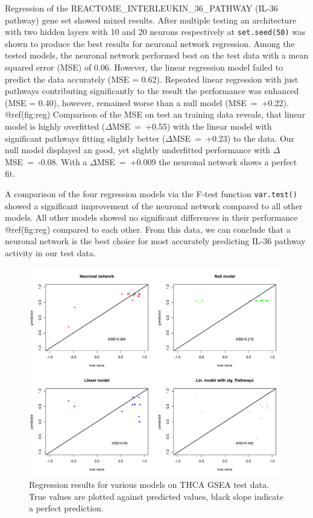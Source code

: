\documentclass[
  parskip,
  oneside]{scrreprt}
\begin{document}
Regression of the REACTOME\_INTERLEUKIN\_36\_PATHWAY (IL-36 pathway)
gene set showed mixed results. After multiple testing an architecture
with two hidden layers with 10 and 20 neurons respectively at
\texttt{set.seed(50)} was shown to produce the best results for neuronal
network regression. Among the tested models, the neuronal network
performed best on the test data with a mean squared error (MSE) of 0.06.
However, the linear regression model failed to predict the data
accurately (MSE = 0.62). Repeated linear regression with just pathways
contributing significantly to the result the performance was enhanced
(MSE = 0.40), however, remained worse than a null model (MSE~=~+0.22).
@ref(fig:reg) Comparison of the MSE on test an training data reveals,
that linear model is highly overfitted (\(\Delta\)MSE~=~+0.55) with the
linear model with significant pathways fitting slightly better
(\(\Delta\)MSE~=~+0.23) to the data. Our null model displayed an good,
yet slightly underfitted performance with \(\Delta\)MSE~=~-0.08. With a
\(\Delta\)MSE~=~+0.009 the neuronal network shows a perfect fit.

A comparison of the four regression models via the F-test function
\texttt{var.test()} showed a significant improvement of the neuronal
network compared to all other models. All other models showed no
significant differences in their performance @ref(fig:reg) compared to
each other. From this data, we can conclude that a neuronal network is
the best choice for most accurately predicting IL-36 pathway activity in
our test data.

\begin{figure}

{\centering \includegraphics[width=0.8\linewidth]{figures/Regression comparison plot IL36 genes} 

}

\caption{Regression results for various models on THCA GSEA test data. True values are plotted against predicted values, black slope indicate a perfect prediction.}\label{fig:reg}
\end{figure}
\end{document}

